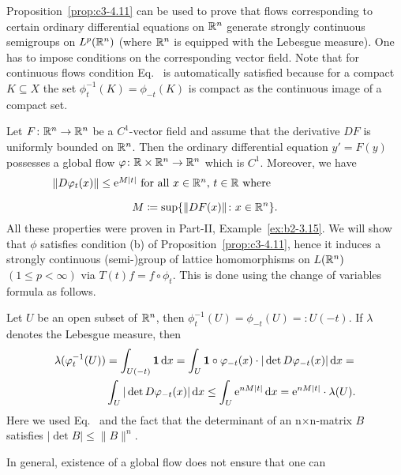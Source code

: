 Proposition~\ref{prop:c3-4.11} can be used to prove that flows corresponding to certain
ordinary differential equations on $\mathbb{R} ^n$ generate strongly continuous
semigroups on $L^p(\mathbb{R} ^n)$ (where $\mathbb{R} ^n$ is equipped with the Lebesgue
measure). One has to impose conditions on the corresponding vector
field. Note that for continuous flows condition Eq.~ is automatically satisfied because for a compact $K \subseteq X$ the set $\phi_t^{-1}(K) = \phi_{-t}(K)$
is compact as the continuous image of a compact set.
\begin{example}\label{ex:c3-4.12}
Let $F \colon \mathbb{R} ^n \to \mathbb{R} ^n$ be a $C^1$-vector field and assume that
the derivative $DF$ is uniformly bounded on $\mathbb{R} ^n$. Then the ordinary
differential equation $y' = F(y)$ possesses a global flow
$\phi \colon \R  \times \R ^n \to \R ^n$ which is $C^1$. Moreover, we have
\begin{equation}\label{eq:c3-4.13}
\begin{minipage}{.8\textwidth} 
$\|D\phi_t(x)\| \leq \eu^{M|t|}$  for all  $x \in \R ^n$, $t \in \R$  where   
%
\[
	M \coloneq  \sup \{\|DF(x)\| \colon x \in \R ^n\}.
\]
% 
\end{minipage}
\end{equation}
All these properties were proven in Part-II, Example~\ref{ex:b2-3.15}.
We will show that $\phi$ satisfies condition (b) of Proposition~\ref{prop:c3-4.11},
hence it induces a strongly continuous (semi-)group of lattice homomorphisms
on $L(\mathbb{R} ^n)$ $(1 \leq p < \infty)$ via $T(t)f = f \circ \phi_t$.
This is done using the change of variables formula as follows.

Let $U$ be an open subset of\/ $\mathbb{R} ^n$, then $\phi_t^{-1}(U) = \phi_{-t}(U) =\colon U(-t)$. 
If\/ $\lambda$ denotes the Lebesgue measure, then
\begin{equation}\label{eq:c3-4.14}
	\begin{split}
		\lambda(\phi_t^{-1}(U)) &= \int_{U(-t)} \1 \dx  = \int_{U} \1 \circ \phi_{-t}(x) \cdot |\det D\phi_{-t}(x)| \dx  = \\
		&\int_{U} |\det D\phi_{-t}(x)| \dx  \leq \int_{U} \eu^{nM|t|} \dx  = \eu^{nM|t|} \cdot \lambda(U).
	\end{split}
\end{equation}
Here we used Eq.~ and the fact that the determinant of an n$\times$n-matrix
$B$ satisfies $|\det B| \leq \|B\|^n$. 
\end{example}
In general, existence of a global flow does not ensure that one can
